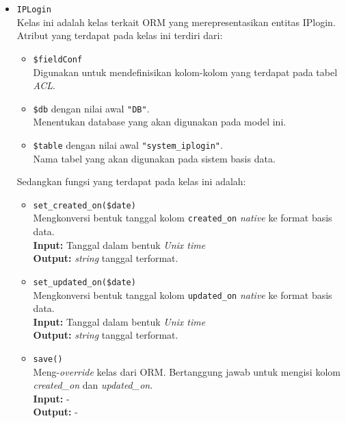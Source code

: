 \begin{itemize}
        \item \texttt{IPLogin} \\
            Kelas ini adalah kelas terkait ORM yang merepresentasikan entitas IPlogin. Atribut yang terdapat pada kelas ini terdiri dari:
            \begin{itemize}
                \item \texttt{\$fieldConf} \\
                    Digunakan untuk mendefinisikan kolom-kolom yang terdapat pada tabel \textit{ACL}.
                \item \texttt{\$db} dengan nilai awal \texttt{"DB"}. \\
                    Menentukan database yang akan digunakan pada model ini.
                \item \texttt{\$table} dengan nilai awal \texttt{"system\_iplogin"}. \\
                    Nama tabel yang akan digunakan pada sistem basis data. 
            \end{itemize}
            Sedangkan fungsi yang terdapat pada kelas ini adalah:
            \begin{itemize}
                \item \texttt{set\_created\_on(\$date)} \\
                    Mengkonversi bentuk tanggal kolom \texttt{created\_on} \textit{native} ke 
                    format basis data. \\
                    \textbf{Input:} Tanggal dalam bentuk \textit{Unix time}\\
                    \textbf{Output:} \textit{string} tanggal terformat.
                
                \item \texttt{set\_updated\_on(\$date)} \\
                    Mengkonversi bentuk tanggal kolom \texttt{updated\_on} \textit{native} ke 
                    format basis data. \\
                    \textbf{Input:} Tanggal dalam bentuk \textit{Unix time}\\
                    \textbf{Output:} \textit{string} tanggal terformat.
                
                \item \texttt{save()}\\
                    Meng-\textit{override} kelas dari ORM. Bertanggung jawab untuk mengisi
                    kolom \textit{created\_on} dan \textit{updated\_on}.\\
                    \textbf{Input:} -\\
                    \textbf{Output:} -
            \end{itemize}
    \end{itemize}
    
